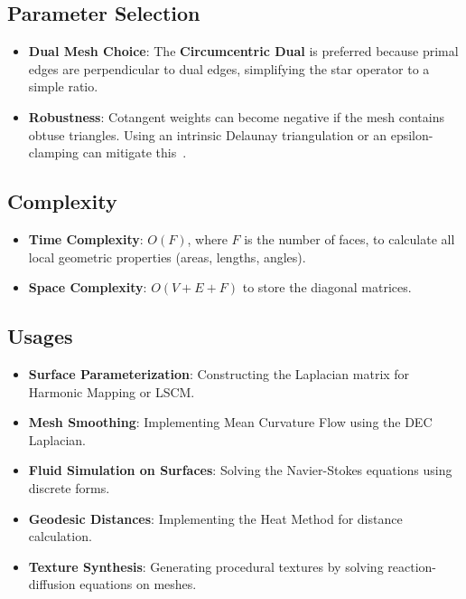 \subsection{Parameter Selection}
\begin{itemize}
    \item \textbf{Dual Mesh Choice}: The \textbf{Circumcentric Dual} is preferred because primal edges are perpendicular to dual edges, simplifying the star operator to a simple ratio.
    \item \textbf{Robustness}: Cotangent weights can become negative if the mesh contains obtuse triangles. Using an intrinsic Delaunay triangulation or an epsilon-clamping can mitigate this~\cite{pinkall1993}.
\end{itemize}

\subsection{Complexity}
\begin{itemize}
    \item \textbf{Time Complexity}: $O(F)$, where $F$ is the number of faces, to calculate all local geometric properties (areas, lengths, angles).
    \item \textbf{Space Complexity}: $O(V + E + F)$ to store the diagonal matrices.
\end{itemize}

\subsection{Usages}
\begin{itemize}
    \item \textbf{Surface Parameterization}: Constructing the Laplacian matrix for Harmonic Mapping or LSCM.
    \item \textbf{Mesh Smoothing}: Implementing Mean Curvature Flow using the DEC Laplacian.
    \item \textbf{Fluid Simulation on Surfaces}: Solving the Navier-Stokes equations using discrete forms.
    \item \textbf{Geodesic Distances}: Implementing the Heat Method for distance calculation.
    \item \textbf{Texture Synthesis}: Generating procedural textures by solving reaction-diffusion equations on meshes.
\end{itemize}

